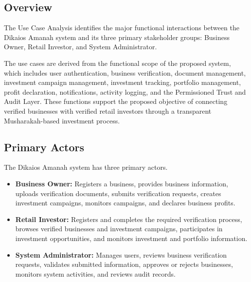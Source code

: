 
\subsection{Overview}

The Use Case Analysis identifies the major functional interactions between
the Dikaios Amanah system and its three primary stakeholder groups:
Business Owner, Retail Investor, and System Administrator.

The use cases are derived from the functional scope of the proposed system,
which includes user authentication, business verification, document
management, investment campaign management, investment tracking, portfolio
management, profit declaration, notifications, activity logging, and the
Permissioned Trust and Audit Layer. These functions support the proposed
objective of connecting verified businesses with verified retail investors
through a transparent Musharakah-based investment process.

\subsection{Primary Actors}

The Dikaios Amanah system has three primary actors.

\begin{itemize}
    \item \textbf{Business Owner:} Registers a business, provides business
    information, uploads verification documents, submits verification
    requests, creates investment campaigns, monitors campaigns, and declares
    business profits.

    \item \textbf{Retail Investor:} Registers and completes the required
    verification process, browses verified businesses and investment
    campaigns, participates in investment opportunities, and monitors
    investment and portfolio information.

    \item \textbf{System Administrator:} Manages users, reviews business
    verification requests, validates submitted information, approves or
    rejects businesses, monitors system activities, and reviews audit records.
\end{itemize}



